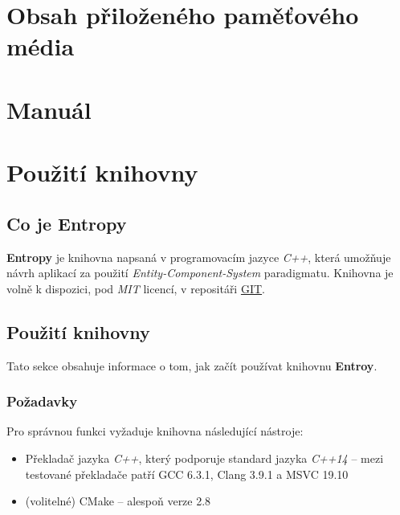 
\chapter{Obsah přiloženého paměťového média}

\chapter{Manuál}

\chapter{Použití knihovny}

\section*{Co je Entropy}

\textbf{Entropy} je knihovna napsaná v programovacím jazyce \emph{C++}, která umožňuje návrh aplikací za použití \emph{Entity-Component-System} paradigmatu. Knihovna je volně k dispozici, pod \emph{MIT} licencí, v repositáři \href{https://github.com/T0mt0mp/Entropy}{GIT}. 

\section*{Použití knihovny}

Tato sekce obsahuje informace o tom, jak začít používat knihovnu \textbf{Entroy}.

\subsection*{Požadavky}

Pro správnou funkci vyžaduje knihovna následující nástroje: 
\begin{itemize}
	\item Překladač jazyka \emph{C++}, který podporuje standard jazyka \emph{C++14} -- mezi testované překladače patří GCC 6.3.1, Clang 3.9.1 a MSVC 19.10
	\item (volitelné) CMake -- alespoň verze 2.8
\end{itemize}

